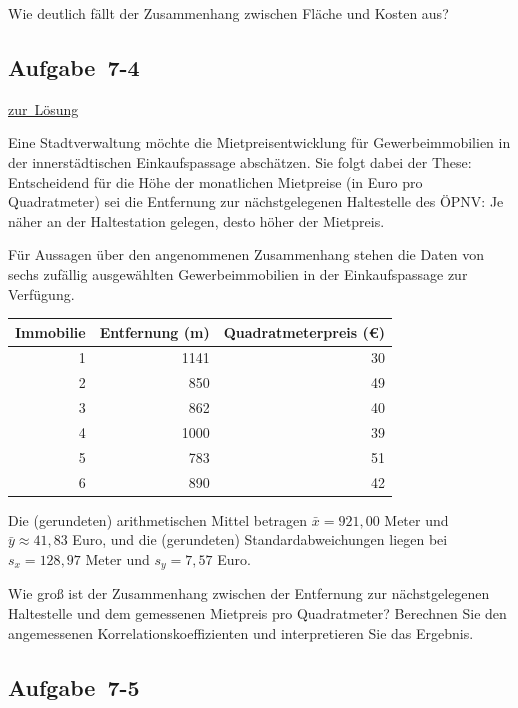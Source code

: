 \documentclass[
  11pt,
  ngerman,
  a4paper,
]{report}
\begin{document}
Wie deutlich fällt der Zusammenhang zwischen Fläche und Kosten aus?

\hypertarget{aufgabe-7-4}{%
\subsection{Aufgabe~7-4}\label{aufgabe-7-4}}

\protect\hyperlink{loesung-7-4}{zur~Lösung}

Eine Stadtverwaltung möchte die Mietpreisentwicklung für Gewerbeimmobilien in der innerstädtischen Einkaufspassage abschätzen. Sie folgt dabei der These: Entscheidend für die Höhe der monatlichen Mietpreise (in Euro pro Quadratmeter) sei die Entfernung zur nächstgelegenen Haltestelle des ÖPNV: Je näher an der Haltestation gelegen, desto höher der Mietpreis.

Für Aussagen über den angenommenen Zusammenhang stehen die Daten von sechs zufällig ausgewählten Gewerbeimmobilien in der Einkaufspassage zur Verfügung.

\begin{table}[H]
\centering
\begin{tabular}{rrr}
\toprule
\textbf{Immobilie} & \textbf{Entfernung (m)} & \textbf{Quadratmeterpreis (€)}\\
\midrule
1 & 1141 & 30\\
2 & 850 & 49\\
3 & 862 & 40\\
4 & 1000 & 39\\
5 & 783 & 51\\
6 & 890 & 42\\
\bottomrule
\end{tabular}
\end{table}

Die (gerundeten) arithmetischen Mittel betragen \(\bar{x} = 921{,}00\) Meter und \(\bar{y} \approx 41{,}83\) Euro, und die (gerundeten) Standardabweichungen liegen bei \(s_x = 128{,}97\) Meter und \(s_y = 7{,}57\) Euro.

Wie groß ist der Zusammenhang zwischen der Entfernung zur nächstgelegenen Haltestelle und dem gemessenen Mietpreis pro Quadratmeter? Berechnen Sie den angemessenen Korrelationskoeffizienten und interpretieren Sie das Ergebnis.

\hypertarget{aufgabe-7-5}{%
\subsection{Aufgabe~7-5}\label{aufgabe-7-5}}
\end{document}
